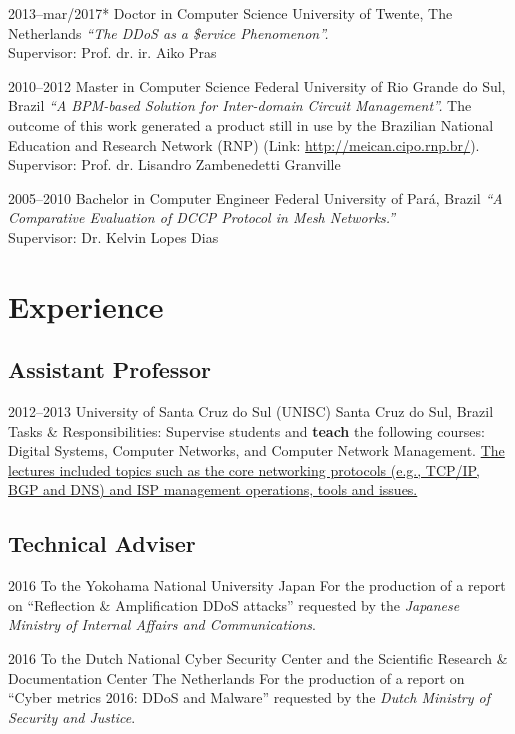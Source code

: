 \documentclass[print]{friggeri-cv} %
\begin{document}
\begin{entrylist}

\entry
{2013--mar/2017*}
{Doctor {\normalfont in Computer Science}}
{University of Twente, The Netherlands}
{\emph{``The DDoS as a \$ervice Phenomenon''.} \\
Supervisor: Prof. dr. ir. Aiko Pras 
}	

\entry
{2010--2012}
{Master {\normalfont in Computer Science}}
{Federal University of Rio Grande do Sul, Brazil}
{\emph{``A BPM-based Solution for Inter-domain Circuit Management''.} The outcome of this work generated a product still in use by the Brazilian National Education and Research Network (RNP) (Link: \href{http://meican.cipo.rnp.br/}{http://meican.cipo.rnp.br/}).\\
Supervisor: Prof. dr. Lisandro Zambenedetti Granville}

\entry
{2005--2010}
{Bachelor {\normalfont in Computer Engineer}}
{Federal University of Par\'a, Brazil}
{\emph{``A Comparative Evaluation of DCCP Protocol in Mesh Networks.''} \\ 
Supervisor: Dr. Kelvin Lopes Dias
}

\end{entrylist}

\section{Experience}

\subsection{Assistant Professor}
\begin{entrylist}
\entry
{2012--2013}
{University of Santa Cruz do Sul (UNISC)}
{Santa Cruz do Sul, Brazil}
{Tasks \& Responsibilities: Supervise students and \textbf{teach} the following courses: Digital Systems, Computer Networks, and Computer Network Management. \ul{The lectures included topics such as the core networking protocols (e.g., TCP/IP, BGP and DNS) and ISP management operations, tools and issues.}}
\end{entrylist}

\subsection{Technical Adviser}
\begin{entrylist}
\entry
{2016}
{To the Yokohama National University}
{Japan}
{For the production of a report on ``Reflection \& Amplification DDoS attacks'' requested by the \emph{Japanese Ministry of Internal Affairs and Communications}.}

\entry
{2016}
{To the Dutch National Cyber Security Center and the Scientific Research \& Documentation Center}
{The Netherlands}
{For the production of a report on ``Cyber metrics 2016: DDoS and Malware'' requested by the \emph{Dutch Ministry of Security and Justice}.}
\end{entrylist}
\end{document}
